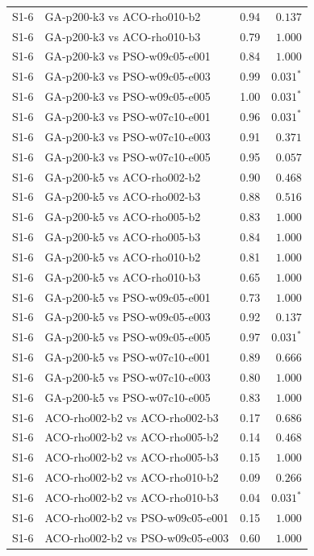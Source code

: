 \begin{tabular}{llrr}
S1-6 & GA-p200-k3 vs ACO-rho010-b2 & 0.94 & $0.137$ \\
S1-6 & GA-p200-k3 vs ACO-rho010-b3 & 0.79 & $1.000$ \\
S1-6 & GA-p200-k3 vs PSO-w09c05-e001 & 0.84 & $1.000$ \\
S1-6 & GA-p200-k3 vs PSO-w09c05-e003 & 0.99 & $0.031^{*}$ \\
S1-6 & GA-p200-k3 vs PSO-w09c05-e005 & 1.00 & $0.031^{*}$ \\
S1-6 & GA-p200-k3 vs PSO-w07c10-e001 & 0.96 & $0.031^{*}$ \\
S1-6 & GA-p200-k3 vs PSO-w07c10-e003 & 0.91 & $0.371$ \\
S1-6 & GA-p200-k3 vs PSO-w07c10-e005 & 0.95 & $0.057$ \\
S1-6 & GA-p200-k5 vs ACO-rho002-b2 & 0.90 & $0.468$ \\
S1-6 & GA-p200-k5 vs ACO-rho002-b3 & 0.88 & $0.516$ \\
S1-6 & GA-p200-k5 vs ACO-rho005-b2 & 0.83 & $1.000$ \\
S1-6 & GA-p200-k5 vs ACO-rho005-b3 & 0.84 & $1.000$ \\
S1-6 & GA-p200-k5 vs ACO-rho010-b2 & 0.81 & $1.000$ \\
S1-6 & GA-p200-k5 vs ACO-rho010-b3 & 0.65 & $1.000$ \\
S1-6 & GA-p200-k5 vs PSO-w09c05-e001 & 0.73 & $1.000$ \\
S1-6 & GA-p200-k5 vs PSO-w09c05-e003 & 0.92 & $0.137$ \\
S1-6 & GA-p200-k5 vs PSO-w09c05-e005 & 0.97 & $0.031^{*}$ \\
S1-6 & GA-p200-k5 vs PSO-w07c10-e001 & 0.89 & $0.666$ \\
S1-6 & GA-p200-k5 vs PSO-w07c10-e003 & 0.80 & $1.000$ \\
S1-6 & GA-p200-k5 vs PSO-w07c10-e005 & 0.83 & $1.000$ \\
S1-6 & ACO-rho002-b2 vs ACO-rho002-b3 & 0.17 & $0.686$ \\
S1-6 & ACO-rho002-b2 vs ACO-rho005-b2 & 0.14 & $0.468$ \\
S1-6 & ACO-rho002-b2 vs ACO-rho005-b3 & 0.15 & $1.000$ \\
S1-6 & ACO-rho002-b2 vs ACO-rho010-b2 & 0.09 & $0.266$ \\
S1-6 & ACO-rho002-b2 vs ACO-rho010-b3 & 0.04 & $0.031^{*}$ \\
S1-6 & ACO-rho002-b2 vs PSO-w09c05-e001 & 0.15 & $1.000$ \\
S1-6 & ACO-rho002-b2 vs PSO-w09c05-e003 & 0.60 & $1.000$ \\

\end{tabular}
